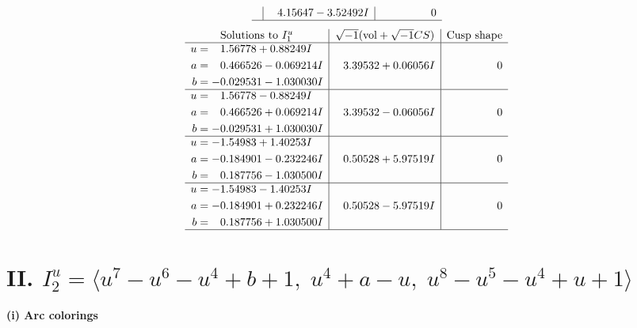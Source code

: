 \documentclass[1p]{elsarticle_modified}
\theoremstyle{definition}
\newcommand{\I}{\sqrt{-1}}
\begin{document}
$$\begin{array}{c|c|c}
 & \phantom{-}4.15647 - 3.52492 I & \phantom{-0.000000 } 0\\
 \hline 
 \end{array}$$\newpage$$\begin{array}{c|c|c}  
\text{Solutions to }I^u_{1}& \I (\text{vol} + \sqrt{-1}CS) & \text{Cusp shape}\\
 \hline 
\begin{aligned}
u &= \phantom{-}1.56778 + 0.88249 I \\
a &= \phantom{-}0.466526 - 0.069214 I \\
b &= -0.029531 - 1.030030 I\end{aligned}
 & \phantom{-}3.39532 + 0.06056 I & \phantom{-0.000000 } 0 \\ \hline\begin{aligned}
u &= \phantom{-}1.56778 - 0.88249 I \\
a &= \phantom{-}0.466526 + 0.069214 I \\
b &= -0.029531 + 1.030030 I\end{aligned}
 & \phantom{-}3.39532 - 0.06056 I & \phantom{-0.000000 } 0 \\ \hline\begin{aligned}
u &= -1.54983 + 1.40253 I \\
a &= -0.184901 - 0.232246 I \\
b &= \phantom{-}0.187756 - 1.030500 I\end{aligned}
 & \phantom{-}0.50528 + 5.97519 I & \phantom{-0.000000 } 0 \\ \hline\begin{aligned}
u &= -1.54983 - 1.40253 I \\
a &= -0.184901 + 0.232246 I \\
b &= \phantom{-}0.187756 + 1.030500 I\end{aligned}
 & \phantom{-}0.50528 - 5.97519 I & \phantom{-0.000000 } 0\\
 \hline 
 \end{array}$$\newpage\newpage\renewcommand{\arraystretch}{1}
\centering \section*{II. $I^u_{2}= \langle u^7- u^6- u^4+b+1,\;u^4+a- u,\;u^8- u^5- u^4+u+1 \rangle$}
\flushleft \textbf{(i) Arc colorings}\\
\end{document}
